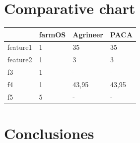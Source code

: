 \section{Comparative chart}

\begin{table}[H]
\begin{tabular}{llll}
\hline
    \rowcolor{lightpurple}
	    & \textbf{farmOS}   & \textbf{Agrineer}& \textbf{PACA} \\ \hline
    \rowcolor{lightgray}
	    feature1 & 1        & 35               & 35                              \\
	    feature2 & 1        & 3                & 3                             \\
    \rowcolor{lightgray}
	    f3       & 1        & -                & -                            \\
	    f4       & 1        & 43,95            & 43,95          \\
    \rowcolor{lightgray}
	    f5       & 5        & -                & -
\end{tabular}
\end{table}


\section{Conclusiones}
